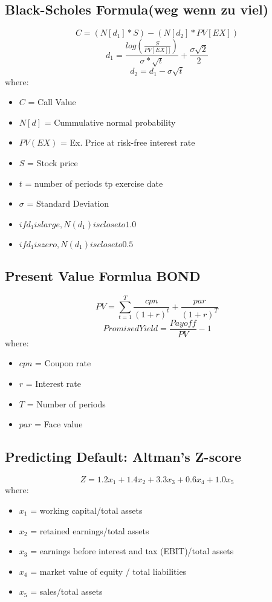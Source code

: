 \documentclass{cheatsheet}
\begin{document}
\subsection{Black-Scholes Formula(weg wenn zu viel)}
\[C = (N[d_1] * S) - (N[d_2] * PV[EX])\]
\[d_1 = \frac{log(\frac{S}{PV[EX]]})}{\sigma *\sqrt{t}} + \frac{\sigma\sqrt{2}}{2}\]
\[d_2 = d_1 - \sigma\sqrt{t}\]
\noindent where:
\begin{itemize}
  \item $C$ = Call Value
  \item $N[d]$ = Cummulative normal probability
  \item $PV(EX)$ = Ex. Price at risk-free interest rate
  \item $S$ = Stock price
  \item $t$ = number of periods tp exercise date
  \item $\sigma$ = Standard Deviation 
  \item $if d_1 is large, N(d_1) is close to 1.0$
  \item $if d_1 is zero, N(d_1) is close to 0.5$
\end{itemize}
\subsection{Present Value Formlua BOND}
\[PV = \sum_{t=1}^{T}\frac{cpn}{(1+r)^{t}}+\frac{par}{(1+r)^{T}}\]
\[Promised Yield = \frac{Payoff}{PV} - 1\]
\noindent where:
\begin{itemize}
  \item $cpn$ = Coupon rate
  \item $r$ = Interest rate
  \item $T$ = Number of periods
  \item $par$ = Face value
\end{itemize}

\subsection{Predicting Default: Altman's Z-score}
\[Z = 1.2x_1 + 1.4x_2 + 3.3x_3 + 0.6x_4 + 1.0x_5\]
\noindent where:
\begin{itemize}
  \item $x_1$ = working capital/total assets
  \item $x_2$ = retained earnings/total assets
  \item $x_3$ = earnings before interest and tax (EBIT)/total assets
  \item $x_4$ = market value of equity / total liabilities
  \item $x_5$ = sales/total assets
\end{itemize}
\end{document}
